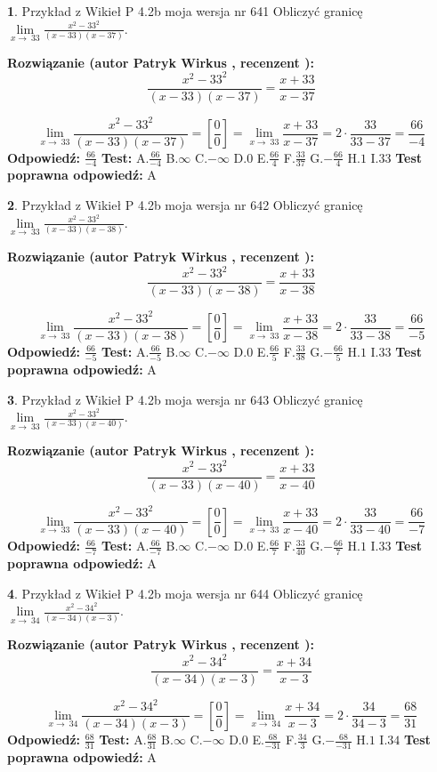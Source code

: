 \documentclass[12pt, a4paper]{article}
\theoremstyle{definition} %
\newtheorem{zad}{}
\newcommand{\zadStart}[1]{\begin{zad}#1\newline}
\newcommand{\zadStop}{\end{zad}}
\newcommand{\rozwStart}[2]{\noindent \textbf{Rozwiązanie (autor #1 , recenzent #2): }\newline}
\newcommand{\rozwStop}{\newline}
\newcommand{\odpStart}{\noindent \textbf{Odpowiedź:}\newline}
\newcommand{\odpStop}{\newline}
\newcommand{\testStart}{\noindent \textbf{Test:}\newline}
\newcommand{\testStop}{\newline}
\newcommand{\kluczStart}{\noindent \textbf{Test poprawna odpowiedź:}\newline}
\newcommand{\kluczStop}{\newline}
\begin{document}
\zadStart{Przykład z Wikieł P 4.2b moja wersja nr 641}
Obliczyć granicę $\lim\limits_{x\to\ 33}\frac{x^{2}-33^{2}}{(x-33)(x-37)}$.
\zadStop
\rozwStart{Patryk Wirkus}{}
$$\frac{x^{2}-33^{2}}{(x-33)(x-37)}=\frac{x+33}{x-37}$$

$$\lim\limits_{x\to\ 33}\frac{x^{2}-33^{2}}{(x-33)(x-37)}=[\frac{0}{0}]=\lim\limits_{x\to\ 33}\frac{x+33}{x-37}=2 \cdot \frac{33}{33-37} = \frac{66}{-4}$$
\rozwStop
\odpStart
$\frac{66}{-4}$
\odpStop
\testStart
A.$\frac{66}{-4}$
B.$\infty$
C.$-\infty$
D.$0$
E.$\frac{66}{4}$
F.$\frac{33}{37}$
G.$-\frac{66}{4}$
H.$1$
I.$33$
\testStop
\kluczStart
A
\kluczStop



\zadStart{Przykład z Wikieł P 4.2b moja wersja nr 642}
Obliczyć granicę $\lim\limits_{x\to\ 33}\frac{x^{2}-33^{2}}{(x-33)(x-38)}$.
\zadStop
\rozwStart{Patryk Wirkus}{}
$$\frac{x^{2}-33^{2}}{(x-33)(x-38)}=\frac{x+33}{x-38}$$

$$\lim\limits_{x\to\ 33}\frac{x^{2}-33^{2}}{(x-33)(x-38)}=[\frac{0}{0}]=\lim\limits_{x\to\ 33}\frac{x+33}{x-38}=2 \cdot \frac{33}{33-38} = \frac{66}{-5}$$
\rozwStop
\odpStart
$\frac{66}{-5}$
\odpStop
\testStart
A.$\frac{66}{-5}$
B.$\infty$
C.$-\infty$
D.$0$
E.$\frac{66}{5}$
F.$\frac{33}{38}$
G.$-\frac{66}{5}$
H.$1$
I.$33$
\testStop
\kluczStart
A
\kluczStop



\zadStart{Przykład z Wikieł P 4.2b moja wersja nr 643}
Obliczyć granicę $\lim\limits_{x\to\ 33}\frac{x^{2}-33^{2}}{(x-33)(x-40)}$.
\zadStop
\rozwStart{Patryk Wirkus}{}
$$\frac{x^{2}-33^{2}}{(x-33)(x-40)}=\frac{x+33}{x-40}$$

$$\lim\limits_{x\to\ 33}\frac{x^{2}-33^{2}}{(x-33)(x-40)}=[\frac{0}{0}]=\lim\limits_{x\to\ 33}\frac{x+33}{x-40}=2 \cdot \frac{33}{33-40} = \frac{66}{-7}$$
\rozwStop
\odpStart
$\frac{66}{-7}$
\odpStop
\testStart
A.$\frac{66}{-7}$
B.$\infty$
C.$-\infty$
D.$0$
E.$\frac{66}{7}$
F.$\frac{33}{40}$
G.$-\frac{66}{7}$
H.$1$
I.$33$
\testStop
\kluczStart
A
\kluczStop



\zadStart{Przykład z Wikieł P 4.2b moja wersja nr 644}
Obliczyć granicę $\lim\limits_{x\to\ 34}\frac{x^{2}-34^{2}}{(x-34)(x-3)}$.
\zadStop
\rozwStart{Patryk Wirkus}{}
$$\frac{x^{2}-34^{2}}{(x-34)(x-3)}=\frac{x+34}{x-3}$$

$$\lim\limits_{x\to\ 34}\frac{x^{2}-34^{2}}{(x-34)(x-3)}=[\frac{0}{0}]=\lim\limits_{x\to\ 34}\frac{x+34}{x-3}=2 \cdot \frac{34}{34-3} = \frac{68}{31}$$
\rozwStop
\odpStart
$\frac{68}{31}$
\odpStop
\testStart
A.$\frac{68}{31}$
B.$\infty$
C.$-\infty$
D.$0$
E.$\frac{68}{-31}$
F.$\frac{34}{3}$
G.$-\frac{68}{-31}$
H.$1$
I.$34$
\testStop
\kluczStart
A
\kluczStop
\end{document}
